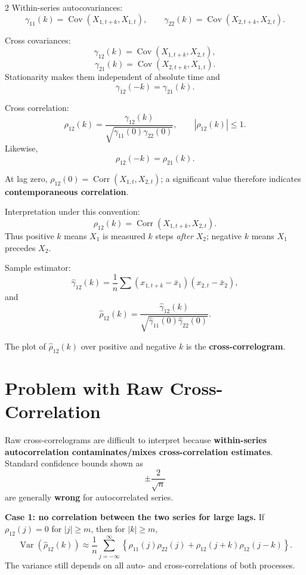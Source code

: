 \documentclass[9pt,a4paper]{extarticle}
\newcommand{\key}[1]{\textbf{#1}}
\begin{document}
\begin{multicols}{2}
Within-series autocovariances:
\[
\gamma_{11}(k)=\operatorname{Cov}(X_{1,t+k},X_{1,t}),\qquad
\gamma_{22}(k)=\operatorname{Cov}(X_{2,t+k},X_{2,t}).
\]

Cross covariances:
\[
\boxed{
\gamma_{12}(k)
=
\operatorname{Cov}(X_{1,t+k},X_{2,t}),
}
\]
\[
\gamma_{21}(k)
=
\operatorname{Cov}(X_{2,t+k},X_{1,t}).
\]
Stationarity makes them independent of absolute time and
\[
\boxed{\gamma_{12}(-k)=\gamma_{21}(k).}
\]

Cross correlation:
\[
\boxed{
\rho_{12}(k)=
\frac{\gamma_{12}(k)}
{\sqrt{\gamma_{11}(0)\gamma_{22}(0)}},
\qquad |\rho_{12}(k)|\le1.
}
\]
Likewise,
\[
\boxed{\rho_{12}(-k)=\rho_{21}(k).}
\]

At lag zero, \(\rho_{12}(0)=\operatorname{Corr}(X_{1,t},X_{2,t})\); a significant value therefore indicates \key{contemporaneous correlation}.

Interpretation under this convention:
\[
\rho_{12}(k)
=
\operatorname{Corr}(X_{1,t+k},X_{2,t}).
\]
Thus positive \(k\) means \(X_1\) is measured \(k\) steps \emph{after} \(X_2\); negative \(k\) means \(X_1\) precedes \(X_2\).

Sample estimator:
\[
\widehat\gamma_{12}(k)
=
\frac1n
\sum
(x_{1,t+k}-\bar x_1)
(x_{2,t}-\bar x_2),
\]
and
\[
\boxed{
\widehat\rho_{12}(k)=
\frac{\widehat\gamma_{12}(k)}
{\sqrt{\widehat\gamma_{11}(0)
\widehat\gamma_{22}(0)}}.
}
\]

The plot of \(\widehat\rho_{12}(k)\) over positive and negative \(k\) is the \key{cross-correlogram}.

\section{Problem with Raw Cross-Correlation}

Raw cross-correlograms are difficult to interpret because \key{within-series autocorrelation contaminates/mixes cross-correlation estimates}. Standard confidence bounds shown as
\[
\pm\frac{2}{\sqrt n}
\]
are generally \key{wrong} for autocorrelated series.

\textbf{Case 1: no correlation between the two series for large lags.} If
\(\rho_{12}(j)=0\) for \(|j|\ge m\), then for \(|k|\ge m\),
\[
\boxed{
\operatorname{Var}(\widehat\rho_{12}(k))
\approx\frac1n\sum_{j=-\infty}^{\infty}
\left\{\rho_{11}(j)\rho_{22}(j)+
\rho_{12}(j+k)\rho_{12}(j-k)\right\}.
}
\]
The variance still depends on all auto- and cross-correlations of both processes.


\end{multicols}
\end{document}

